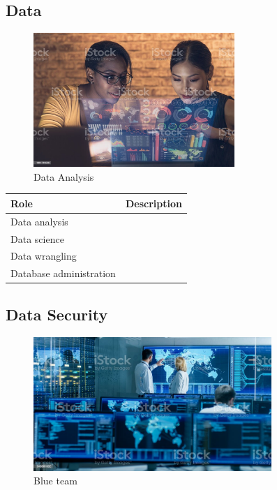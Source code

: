 \subsection{Data}

\begin{figure}[H]
	\begin{center}
		\caption{Data Analysis}
		\vskip 4pt
		\includegraphics[height=2in]{images/careers/istockphoto-1364769258-1024x1024.jpg}
	\end{center}
\end{figure}

\begin{table}[H]
	\begin{center}
		\begin{tabular}{p{1.3in}|p{3in}} 
			\textbf{Role} & \textbf{Description}\\
			\hline
			Data analysis & \\
			\hline
			Data science & \\
			\hline
			Data wrangling & \\
			\hline
			Database administration & \\
			\hline
		\end{tabular}
	\end{center}
\end{table}

\subsection{Data Security}

\begin{figure}[H]
	\begin{center}
		\caption{Blue team}
		\vskip 4pt
		\includegraphics[height=2in]{images/careers/istockphoto-949581032-1024x1024.jpg}
	\end{center}
\end{figure}

